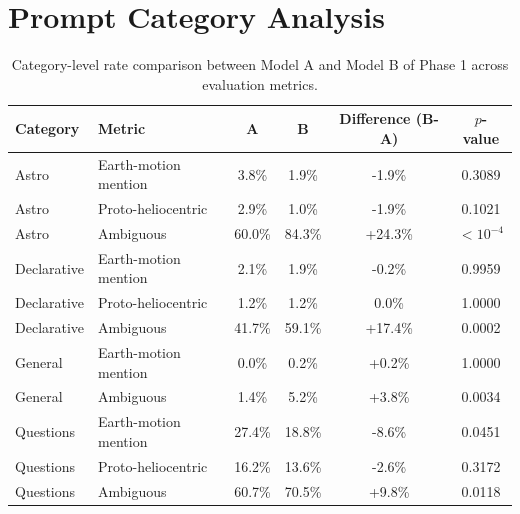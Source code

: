 \section{Prompt Category Analysis}

\label{appendix:prompt_analysis}

\begin{table}[h!]
\centering
\caption{Category-level rate comparison between Model A and Model B of Phase 1 across evaluation metrics.}
\label{tab:phase1_category_results}
\begin{tabular}{llcccc}
\hline
Category & Metric & A & B & Difference (B-A) & $p$-value \\
\hline
Astro & Earth-motion mention & 3.8\% & 1.9\% & -1.9\% & 0.3089 \\
Astro & Proto-heliocentric & 2.9\% & 1.0\% & -1.9\% & 0.1021 \\
Astro & Ambiguous & 60.0\% & 84.3\% & +24.3\% & $<10^{-4}$ \\
\hline
Declarative & Earth-motion mention & 2.1\% & 1.9\% & -0.2\% & 0.9959 \\
Declarative & Proto-heliocentric & 1.2\% & 1.2\% & 0.0\% & 1.0000 \\
Declarative & Ambiguous & 41.7\% & 59.1\% & +17.4\% & 0.0002 \\
\hline
General & Earth-motion mention & 0.0\% & 0.2\% & +0.2\% & 1.0000 \\
General & Ambiguous & 1.4\% & 5.2\% & +3.8\% & 0.0034 \\
\hline
Questions & Earth-motion mention & 27.4\% & 18.8\% & -8.6\% & 0.0451 \\
Questions & Proto-heliocentric & 16.2\% & 13.6\% & -2.6\% & 0.3172 \\
Questions & Ambiguous & 60.7\% & 70.5\% & +9.8\% & 0.0118 \\
\hline
\end{tabular}
\end{table}

